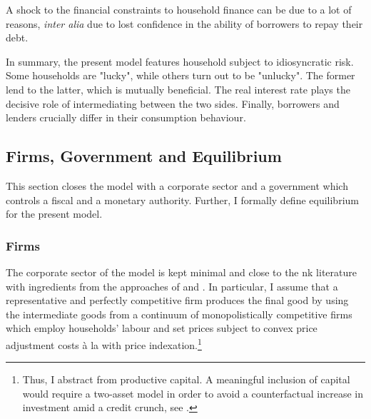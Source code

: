 \documentclass[a4paper,12pt]{article} %
\numberwithin{equation}{section} %
\numberwithin{figure}{section}
\numberwithin{table}{section}
\begin{document}
A shock to the financial constraints to household finance can be due to a lot of reasons, \textit{inter alia} due to lost confidence in the ability of borrowers to repay their debt.

In summary, the present model features household subject to idiosyncratic risk. Some households are "lucky", while others turn out to be "unlucky". The former lend to the latter, which is mutually beneficial. The real interest rate plays the decisive role of intermediating between the two sides. Finally, borrowers and lenders crucially differ in their consumption behaviour.


\subsection{Firms, Government and Equilibrium}
\label{sec:model-sectors}

This section closes the model with a corporate sector and a government which controls a fiscal and a monetary authority. Further, I formally define equilibrium for the present model.

\subsubsection{Firms}
\label{sec:model-firms}

The corporate sector of the model is kept minimal and close to the \Gls{nk} literature with ingredients from the approaches of \textcite{mckay2016} and \textcite{gust2017wp}. In particular, I assume that a representative and perfectly competitive firm produces the final good by using the intermediate goods from a continuum of monopolistically competitive firms which employ households' labour and set prices subject to convex price adjustment costs à la \textcite{rotemberg1982} with price indexation.\footnote{Thus, I abstract from productive capital. A meaningful inclusion of capital would require a two-asset model in order to avoid a counterfactual increase in investment amid a credit crunch, see \textcite{kv2018}.}
\end{document}
